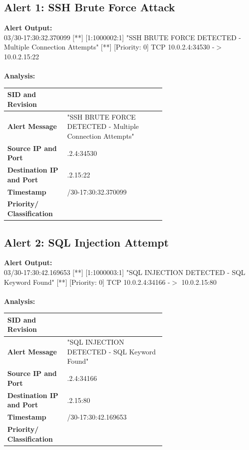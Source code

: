 \documentclass[12pt]{article}
\newcommand{\colSmall}{0.16\linewidth} %
\newcommand{\colBig}{0.48\linewidth}   %
\begin{document}
\subsection{Alert 1: SSH Brute Force Attack}
\textbf{Alert Output:}\\
03/30-17:30:32.370099 [**] [1:1000002:1] "SSH BRUTE FORCE DETECTED - Multiple Connection Attempts" [**] [Priority: 0] {TCP} 10.0.2.4:34530 -$>$ 10.0.2.15:22
\\
\ \\
\textbf{Analysis:}
{\singlespacing
	\begin{longtable}{
 		||>{\raggedright\arraybackslash}p{\colSmall}
  		| >{\raggedright\arraybackslash}p{\colBig}||}
		\hline
  	    	 \textbf{SID and Revision} & [1:1000002:1] \\
			 \hline
			 \textbf{Alert Message} & "SSH BRUTE FORCE DETECTED - Multiple Connection Attempts" \\
			 \hline
			 \textbf{Source IP and Port} & 10.0.2.4:34530 \\
			 \hline
			 \textbf{Destination IP and Port} & 10.0.2.15:22 \\
			 \hline
			 \textbf{Timestamp} & 03/30-17:30:32.370099 \\
			 \hline
			 \textbf{Priority/ Classification} & 0 \\
		\hline
	\end{longtable}
}

\subsection {Alert 2: SQL Injection Attempt}
\textbf{Alert Output:}\\
03/30-17:30:42.169653 [**] [1:1000003:1] "SQL INJECTION DETECTED - SQL Keyword Found" [**] [Priority: 0] {TCP} 10.0.2.4:34166 -$>$ 10.0.2.15:80\\
\ \\
\textbf{Analysis:}
{\singlespacing
	\begin{longtable}{
 		||>{\raggedright\arraybackslash}p{\colSmall}
  		| >{\raggedright\arraybackslash}p{\colBig}||}
		\hline
  	    	 \textbf{SID and Revision} & [1:1000003:1] \\
			 \hline
			 \textbf{Alert Message} & "SQL INJECTION DETECTED - SQL Keyword Found" \\
			 \hline
			 \textbf{Source IP and Port} & 10.0.2.4:34166 \\
			 \hline
			 \textbf{Destination IP and Port} & 10.0.2.15:80 \\
			 \hline
			 \textbf{Timestamp} & 03/30-17:30:42.169653 \\
			 \hline
			 \textbf{Priority/ Classification} & 0 \\
		\hline
	\end{longtable}
}
\newpage
\end{document}
